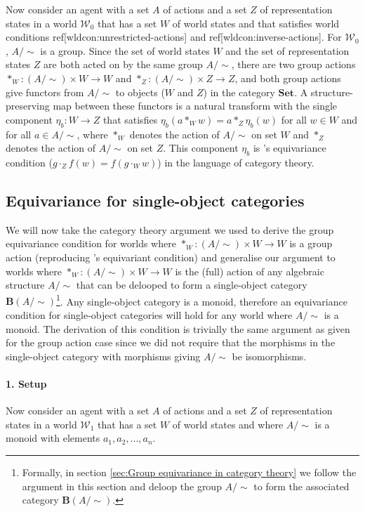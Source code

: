 Now consider an agent with a set $A$ of actions and a set $Z$ of representation states in a world $\mathscr{W}_{0}$ that has a set $W$ of world states and that satisfies world conditions ref[wldcon:unrestricted-actions] and ref[wldcon:inverse-actions].
For $\mathscr{W}_{0}$, $A/\sim$ is a group.
Since the set of world states $W$ and the set of representation states $Z$ are both acted on by the same group $A/\sim$, there are two group actions $*_{W}: (A/\sim) \times W \to W$ and $*_{Z}: (A/\sim) \times Z \to Z$, and both group actions give functors from $A/\sim$ to objects ($W$ and $Z$) in the category $\textbf{Set}$.
A structure-preserving map between these functors is a natural transform with the single component $\eta_{b}: W \to Z$ that satisfies $\eta_{b}(a *_{W} w) = a *_{Z} \eta_{b}(w)$ for all $w \in W$ and for all $a \in A/\sim$, where $*_{W}$ denotes the action of $A/\sim$ on set $W$ and $*_{Z}$ denotes the action of $A/\sim$ on set $Z$.
This component $\eta_{b}$ is \autocite{Higgins2018}'s equivariance condition ($g \cdot_{Z} f(w) = f(g \cdot_{W} w)$) in the language of category theory.

\subsection{Equivariance for single-object categories}

We will now take the category theory argument we used to derive the group equivariance condition for worlds where $*_{W}: (A/\sim) \times W \to W$ is a group action (reproducing \autocite{Higgins2018}'s equivariant condition) and generalise our argument to worlds where $*_{W}: (A/\sim) \times W \to W$ is the (full) action of any algebraic structure $A/\sim$ that can be delooped to form a single-object category $\textbf{B}(A/\sim)$\footnote{Formally, in section \ref{sec:Group equivariance in category theory} we follow the argument in this section and deloop the group $A/\sim$ to form the associated category $\textbf{B}(A/\sim)$.}.
Any single-object category is a monoid, therefore an equivariance condition for single-object categories will hold for any world where $A/\sim$ is a monoid.
The derivation of this condition is trivially the same argument as given for the group action case since we did not require that the morphisms in the single-object category with morphisms giving $A/\sim$ be isomorphisms.

\paragraph{1. Setup}
Now consider an agent with a set $A$ of actions and a set $Z$ of representation states in a world $\mathscr{W}_{1}$ that has a set $W$ of world states and where $A/\sim$ is a monoid with elements $a_{1}, a_{2}, ..., a_{n}$.

